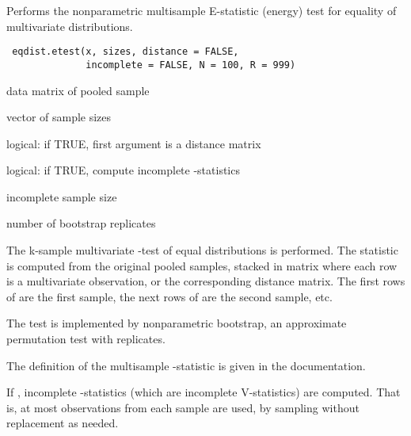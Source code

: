 \documentclass{article}
\begin{document}
\begin{Description}\relax
Performs the nonparametric multisample E-statistic (energy) test
for equality of multivariate distributions.
\end{Description}
\begin{Usage}
\begin{verbatim}
 eqdist.etest(x, sizes, distance = FALSE, 
              incomplete = FALSE, N = 100, R = 999)
\end{verbatim}
\end{Usage}
\begin{Arguments}
\begin{ldescription}
\item[\code{x}] data matrix of pooled sample
\item[\code{sizes}] vector of sample sizes
\item[\code{distance}] logical: if TRUE, first argument is a distance matrix
\item[\code{incomplete}] logical: if TRUE, compute incomplete -statistics
\item[\code{N}] incomplete sample size
\item[\code{R}] number of bootstrap replicates 
\end{ldescription}
\end{Arguments}
\begin{Details}\relax
The k-sample multivariate -test of equal distributions
is performed. The statistic is computed from the original
pooled samples, stacked in matrix  where each row
is a multivariate observation, or the corresponding distance matrix. The
first  rows of  are the first sample, the next
 rows of  are the second sample, etc.

The test is implemented by nonparametric bootstrap, an approximate 
permutation test with  replicates.

The definition of the multisample -statistic is given in the 
 documentation.

If , incomplete -statistics (which are
incomplete V-statistics) are computed. That is, at most
 observations from each sample are used, by sampling without replacement 
as needed.\end{Details}
\end{document}
